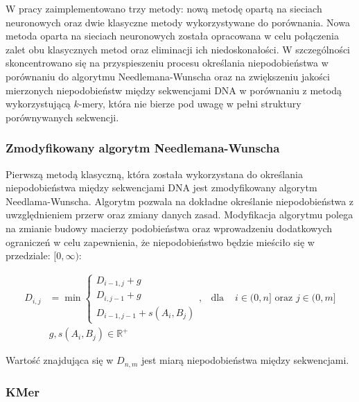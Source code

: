             W pracy zaimplementowano trzy metody: nową metodę opartą na sieciach neuronowych oraz dwie klasyczne metody wykorzystywane do porównania. Nowa metoda oparta na sieciach neuronowych została opracowana w celu połączenia zalet obu klasycznych metod oraz eliminacji ich niedoskonałości. W szczególności skoncentrowano się na przyspieszeniu procesu określania niepodobieństwa w porównaniu do algorytmu Needlemana-Wunscha oraz na zwiększeniu jakości mierzonych niepodobieństw między sekwencjami DNA w porównaniu z metodą wykorzystującą $k$-mery, która nie bierze pod uwagę w pełni struktury porównywanych sekwencji.
    
            \subsubsection{Zmodyfikowany algorytm Needlemana-Wunscha}
            
                Pierwszą metodą klasyczną, która została wykorzystana do określania niepodobieństwa między sekwencjami DNA jest zmodyfikowany algorytm Needlama-Wunscha. Algorytm pozwala na dokładne określanie niepodobieństwa z uwzględnieniem przerw oraz zmiany danych zasad. Modyfikacja algorytmu polega na zmianie budowy macierzy podobieństwa oraz wprowadzeniu dodatkowych ograniczeń w celu zapewnienia, że niepodobieństwo będzie mieściło się w przedziale: $[0, \infty)$:
    
                \begin{equation}
                    \begin{aligned}
                        D_{i,j} &= \min
                        \begin{cases}
                        D_{i - 1, j} + g \\
                        D_{i, j - 1} + g \\
                        D_{i - 1, j - 1} + s(A_i, B_j)
                        \end{cases}, & \text{dla } & i \in (0, n] \text{ oraz } j \in (0, m] \\
                        & g, s(A_i, B_j) \in \mathbb{R}^{+}
                    \end{aligned}
                \end{equation}
    
                Wartość znajdująca się w $D_{n, m}$ jest miarą niepodobieństwa między sekwencjami.
                
            \subsubsection{KMer}
            
